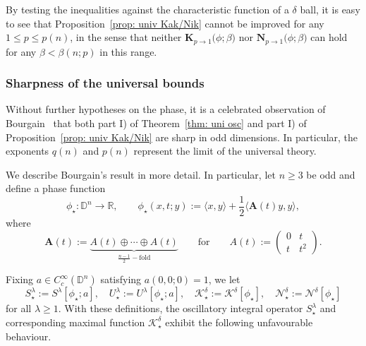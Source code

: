 \documentclass[reqno]{amsart}
\numberwithin{equation}{section}
\newcommand{\D}{\mathbb{D}}
\newcommand{\R}{\mathbb{R}}
\newcommand{\cK}{\mathcal{K}}
\newcommand{\cN}{\mathcal{N}}
\newcommand{\bA}{\mathbf{A}}
\newcommand{\bK}{\mathbf{K}}
\newcommand{\bN}{\mathbf{N}}
\def\inn#1#2{\langle#1,#2\rangle}
\theoremstyle{plain}
\theoremstyle{definition}
\begin{document}
By testing the inequalities against the characteristic function of a $\delta$ ball, it is easy to see that Proposition~\ref{prop: univ Kak/Nik} cannot be improved for any $1 \leq p \leq p(n)$, in the sense that neither $\bK_{p \to 1}\big(\phi;  \beta\big)$ nor $\bN_{p \to 1}\big(\phi;  \beta\big)$ can hold for any $\beta < \beta(n; p)$ in this range. 




\subsubsection*{Sharpness of the universal bounds} Without further hypotheses on the phase, it is a celebrated observation of Bourgain~\cite{Bourgain1991} that both part I) of Theorem~\ref{thm: uni osc} and part I) of Proposition~\ref{prop: univ Kak/Nik} are sharp in odd dimensions. In particular, the exponents $q(n)$ and $p(n)$ represent the limit of the universal theory. 

We describe Bourgain's result in more detail. In particular, let $n \geq 3$ be odd and define a phase function 
\begin{equation*}
\phi_{\star} \colon \D^n \to \R, \qquad \phi_{\star}(x,t; y) := \inn{x}{y} +\frac{1}{2} \inn{\bA(t)y}{y}, \end{equation*}
where
\begin{equation*}
\bA(t) := \underbrace{A(t) \oplus \cdots \oplus A(t)}_{\frac{n-1}{2}-\textrm{fold}} \qquad \textrm{for} \qquad A(t):=
\begin{pmatrix}
0 &t
\\
t &t^2
\end{pmatrix}.
\end{equation*}

Fixing $a \in C^{\infty}_c(\D^n)$ satisfying $a(0,0;0) = 1$, we let \begin{equation*}
    S_{\star}^{\lambda} := S^{\lambda}[\phi_{\star}; a], \quad U_{\star}^{\lambda} := U^{\lambda}[\phi_{\star}; a], \quad \cK^{\delta}_{\star} := \cK^{\delta}[\phi_{\star}], \quad  \cN^{\delta}_{\star} := \cN^{\delta}[\phi_{\star}] 
\end{equation*}
for all $\lambda \geq 1$. With these definitions, the oscillatory integral operator $S_{\star}^{\lambda}$ and corresponding maximal function $\cK^{\delta}_{\star}$ exhibit the following unfavourable behaviour.
\end{document}
